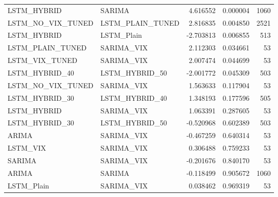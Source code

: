 \begin{table}
\begin{tabular}{llrrr}
LSTM_HYBRID & SARIMA & 4.616552 & 0.000004 & 1060 \\
LSTM_NO_VIX_TUNED & LSTM_PLAIN_TUNED & 2.816835 & 0.004850 & 2521 \\
LSTM_HYBRID & LSTM_Plain & -2.703813 & 0.006855 & 513 \\
LSTM_PLAIN_TUNED & SARIMA_VIX & 2.112303 & 0.034661 & 53 \\
LSTM_VIX_TUNED & SARIMA_VIX & 2.007474 & 0.044699 & 53 \\
LSTM_HYBRID_40 & LSTM_HYBRID_50 & -2.001772 & 0.045309 & 503 \\
LSTM_NO_VIX_TUNED & SARIMA_VIX & 1.563633 & 0.117904 & 53 \\
LSTM_HYBRID_30 & LSTM_HYBRID_40 & 1.348193 & 0.177596 & 505 \\
LSTM_HYBRID & SARIMA_VIX & 1.063391 & 0.287605 & 53 \\
LSTM_HYBRID_30 & LSTM_HYBRID_50 & -0.520968 & 0.602389 & 503 \\
ARIMA & SARIMA_VIX & -0.467259 & 0.640314 & 53 \\
LSTM_VIX & SARIMA_VIX & 0.306488 & 0.759233 & 53 \\
SARIMA & SARIMA_VIX & -0.201676 & 0.840170 & 53 \\
ARIMA & SARIMA & -0.118499 & 0.905672 & 1060 \\
LSTM_Plain & SARIMA_VIX & 0.038462 & 0.969319 & 53 \\
\bottomrule
\end{tabular}
\end{table}
